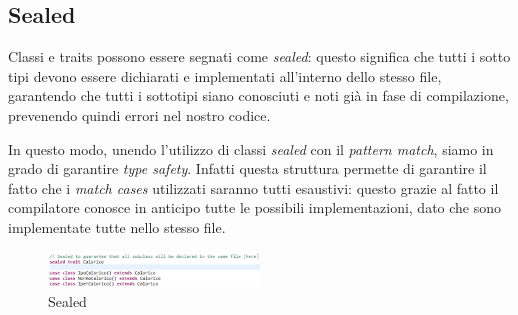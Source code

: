 \subsection{Sealed}
Classi e traits possono essere segnati come \textit{sealed}: questo significa che tutti i sotto tipi devono essere dichiarati e implementati all'interno dello stesso file, garantendo che tutti i sottotipi siano conosciuti e noti già in fase di compilazione, prevenendo quindi errori nel nostro codice.


In questo modo, unendo l'utilizzo di classi \textit{sealed} con il \textit{pattern match}, siamo in grado di garantire \textit{type safety}.
Infatti questa struttura permette di garantire il fatto che i \textit{match cases} utilizzati saranno tutti esaustivi: questo grazie al fatto il compilatore conosce in anticipo tutte le possibili implementazioni, dato che sono implementate tutte nello stesso file.

\begin{figure}[h]
	\centering
	\includegraphics[width=0.5\textwidth]{Immagini/Sealed.png}
	\caption{Sealed}
	\label{fig:sealed}
\end{figure}
